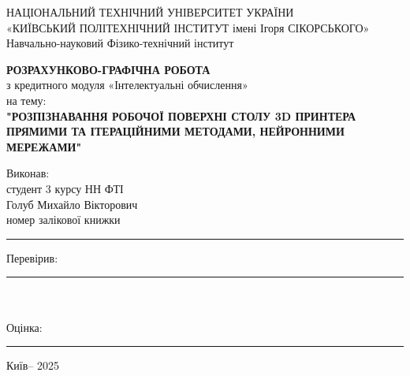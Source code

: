 \documentclass[a4paper,14pt]{report}
\begin{document}
\begin{center}
    \normalsize
    НАЦІОНАЛЬНИЙ ТЕХНІЧНИЙ УНІВЕРСИТЕТ УКРАЇНИ \\
    «КИЇВСЬКИЙ ПОЛІТЕХНІЧНИЙ ІНСТИТУТ імені Ігоря СІКОРСЬКОГО» \\
    Навчально-науковий Фізико-технічний інститут
\end{center}

\vspace*{4cm} %

\begin{center}
    \Large \textbf{РОЗРАХУНКОВО-ГРАФІЧНА РОБОТА} \\
    \normalsize з кредитного модуля «Інтелектуальні обчислення» \\
    на тему: \\
    \textbf{"РОЗПІЗНАВАННЯ РОБОЧОЇ ПОВЕРХНІ СТОЛУ 3D ПРИНТЕРА ПРЯМИМИ ТА ІТЕРАЦІЙНИМИ МЕТОДАМИ, НЕЙРОННИМИ МЕРЕЖАМИ"} \\
\end{center}

\vspace*{4cm} %

\begin{changemargin}{10cm}{0cm} %
    Виконав: \\
    студент 3 курсу НН ФТІ \\
    Голуб Михайло Вікторович \\
    номер залікової книжки \rule{3cm}{0.4pt} %
\end{changemargin}

\vspace*{3cm} %

\begin{changemargin}{10cm}{0cm} %
    Перевірив: \rule{4cm}{0.4pt} \\ \\ %
    Оцінка: \rule{4cm}{0.4pt} %
\end{changemargin}

\vfill %

\begin{center}
    Київ-- 2025
\end{center}
\end{document}
